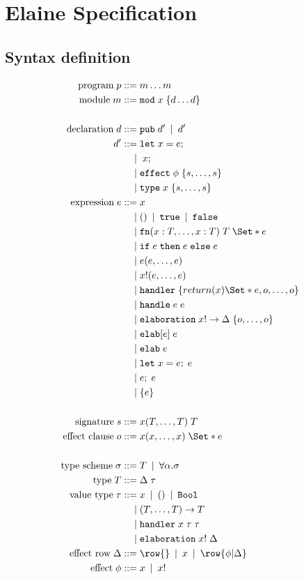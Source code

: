\chapter{Elaine Specification}
\section{Syntax definition}
\begin{align*}
    \text{program}\;p
        \IS & m \dots m\\
    \text{module}\;m
        \IS & \kw{mod}\;x\;\{ d \dots d \}\\
    \\
    \text{declaration}\;d
        \IS & \kw{pub}\;d' \OR d'\\
    d'  \IS & \kw{let}\;x = e;\\
        \OR & \;x;\\
        \OR & \effect\;\phi\;\{s, \dots, s\}\\
        \OR & \type\;x\;\{s, \dots, s\}
    \\
    \text{expression}\;e
        \IS & x\\
        \OR & () \OR \true \OR \false \\
        \OR & \fn(x: T, \dots, x: T)\;T\;\S{e} \\
        \OR & \cond{e}{e}{e}\\
        \OR & e(e,\dots, e) \\
        \OR & x!(e, \dots, e) \\
        \OR & \kw{handler}\;\{return(x) \S{e}, o, \dots, o \}\\
        \OR & \kw{handle}\;e\;e \\
        \OR & \kw{elaboration}\;x! \to \Delta \;\{o, \dots, o\}\\
        \OR & \kw{elab}[e]\;e\\
        \OR & \kw{elab}\;e \\
        \OR & \kw{let}\;x = e;\;e\\
        \OR & e;\;e\\
        \OR & \{ e \}\\
    \\
    \text{signature}\;s
        \IS & x (T, \dots, T)\;T\\
    \text{effect clause}\;o
        \IS & x(x, \dots, x)\;\S{ e }\\
    \\
    \text{type scheme}\;\sigma
        \IS & T \OR \forall \alpha.\sigma\\
    \text{type}\; T
        \IS & \Delta\;\tau \\
    \text{value type}\;\tau
        \IS & x 
        \OR ()
        \OR \Bool \\
        \OR & (T,\dots, T) \to T \\
        \OR & \kw{handler}\;x\;\tau\;\tau \\
        \OR & \kw{elaboration}\;x!\;\Delta \\
    \text{effect row}\;\Delta
        \IS & \row{} \OR  x \OR \row{\phi|\Delta}\\
    \text{effect}\;\phi \IS & x \OR x!
\end{align*}

